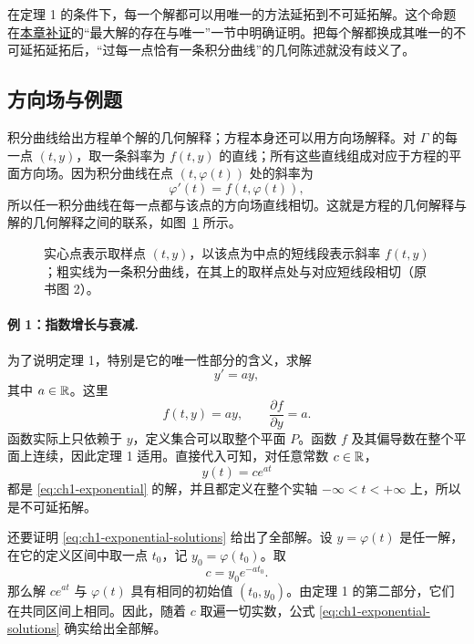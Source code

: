 在定理 1 的条件下，每一个解都可以用唯一的方法延拓到不可延拓解。这个命题在\hyperref[sec:existence-proofs]{本章补证}的“最大解的存在与唯一”一节中明确证明。把每个解都换成其唯一的不可延拓延拓后，“过每一点恰有一条积分曲线”的几何陈述就没有歧义了。

\subsection{方向场与例题}

积分曲线给出方程单个解的几何解释；方程本身还可以用方向场解释。对 \(\Gamma\) 的每一点 \((t,y)\)，取一条斜率为 \(f(t,y)\) 的直线；所有这些直线组成对应于方程的平面方向场。因为积分曲线在点 \((t,\varphi(t))\) 处的斜率为
\[
 \varphi'(t)=f(t,\varphi(t)),
\]
所以任一积分曲线在每一点都与该点的方向场直线相切。这就是方程的几何解释与解的几何解释之间的联系，如图~\ref{fig:ch1-direction-field} 所示。

\begin{figure}[H]
 \centering
 \resizebox{0.46\textwidth}{!}{}
 \caption{实心点表示取样点 \((t,y)\)，以该点为中点的短线段表示斜率 \(f(t,y)\)；粗实线为一条积分曲线，在其上的取样点处与对应短线段相切（原书图 2）。}
 \label{fig:ch1-direction-field}
\end{figure}

\paragraph{例 1：指数增长与衰减.}
为了说明定理 1，特别是它的唯一性部分的含义，求解
\begin{equation}
 y'=ay,
 \label{eq:ch1-exponential}
\end{equation}
其中 \(a\in\mathbb R\)。这里
\[
 f(t,y)=ay,\qquad \frac{\partial f}{\partial y}=a.
\]
函数实际上只依赖于 \(y\)，定义集合可以取整个平面 \(P\)。函数 \(f\) 及其偏导数在整个平面上连续，因此定理 1 适用。直接代入可知，对任意常数 \(c\in\mathbb R\)，
\begin{equation}
 y(t)=ce^{at}
 \label{eq:ch1-exponential-solutions}
\end{equation}
都是 \eqref{eq:ch1-exponential} 的解，并且都定义在整个实轴 \(-\infty<t<+\infty\) 上，所以是不可延拓解。

还要证明 \eqref{eq:ch1-exponential-solutions} 给出了全部解。设 \(y=\varphi(t)\) 是任一解，在它的定义区间中取一点 \(t_0\)，记 \(y_0=\varphi(t_0)\)。取
\[
 c=y_0e^{-at_0}.
\]
那么解 \(ce^{at}\) 与 \(\varphi(t)\) 具有相同的初始值 \((t_0,y_0)\)。由定理 1 的第二部分，它们在共同区间上相同。因此，随着 \(c\) 取遍一切实数，公式 \eqref{eq:ch1-exponential-solutions} 确实给出全部解。

